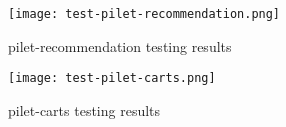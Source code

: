 \documentclass[a4paper]{book}
\begin{document}
\begin{appendix}
\begin{figure}[h!]
    \centering
    \captionsetup{justification=centering}
    \caption{pilet-recommendation testing results}{\texttt{[image: test-pilet-recommendation.png]}}
\end{figure}

\begin{figure}[h!]
    \centering
    \captionsetup{justification=centering}
    \caption{pilet-carts testing results}{\texttt{[image: test-pilet-carts.png]}}
\end{figure}


\end{appendix}

\end{document}
